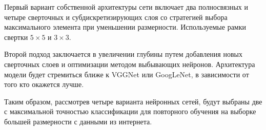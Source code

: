 \documentclass[a4paper,14pt]{extarticle} %
\begin{document}
Первый вариант собственной архитектуры сети включает два полносвязных и четыре сверточных и субдискретизирующих слоя со стратегией выбора максимального элемента при уменьшении размерности. Используемые рамки свертки $5 \times 5$ и $3 \times 3$. 

Второй подход заключается в увеличении глубины путем добавления новых сверточных слоев и оптимизации методом выбывающих нейронов. Архитектура модели будет стремиться ближе к VGGNet или GoogLeNet, в зависимости от того кто окажется лучше.

Таким образом, рассмотрев четыре варианта нейронных сетей, будут выбраны две с максимальной точностью классификации для повторного обучения на выборке большей размерности с данными из интернета.

%
\newpage
\begin{flushleft}
\end{flushleft}
\end{document}
